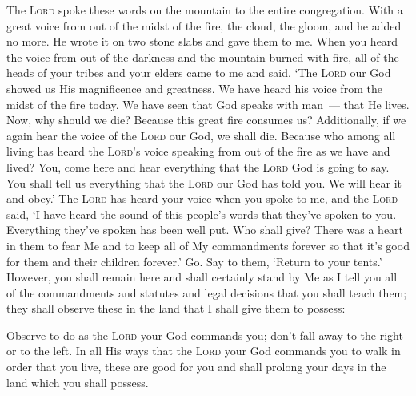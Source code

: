 \begin{inparaenum}
     The \textsc{Lord} spoke these words on the mountain to the entire congregation. With a great voice from out of the midst of the fire, the cloud, the gloom, and he added no more. He wrote it on two stone slabs and gave them to me.%
     When you heard the voice from out of the darkness and the mountain burned with fire, all of the heads of your tribes and your elders came to me%
     and said, `The \textsc{Lord} our God showed us His magnificence and greatness. We have heard his voice from the midst of the fire today. We have seen that God speaks with man~--- that He lives.%
     Now, why should we die? Because this great fire consumes us? Additionally, if we again hear the voice of the \textsc{Lord} our God, we shall die.%
     Because who among all living has heard the \textsc{Lord}'s voice speaking from out of the fire as we have and lived?%
     You, come here and hear everything that the \textsc{Lord} God is going to say. You shall tell us everything that the \textsc{Lord} our God has told you. We will hear it and obey.'%
     The \textsc{Lord} has heard your voice when you spoke to me, and the \textsc{Lord} said, `I have heard the sound of this people's words that they've spoken to you. Everything they've spoken has been well put.%
     Who shall give? There was a heart in them to fear Me and to keep all of My commandments forever so that it's good for them and their children forever.'%
     Go. Say to them, `Return to your tents.'%
     However, you shall remain here and shall certainly stand by Me as I tell you all of the commandments and statutes and legal decisions that you shall teach them; they shall observe these in the land that I shall give them to possess:%
\end{inparaenum}
\begin{enumerate}
    \setcounter{enumi}{31}
     Observe to do as the \textsc{Lord} your God commands you; don't fall away to the right or to the left.%
     In all His ways that the \textsc{Lord} your God commands you to walk in order that you live, these are good for you and shall prolong your days in the land which you shall possess.%
\end{enumerate}
